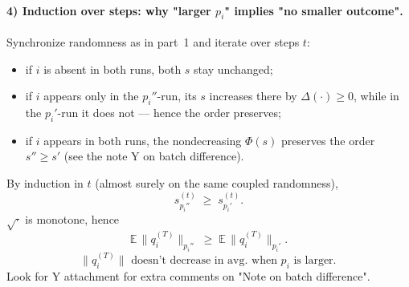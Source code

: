 \paragraph{4) Induction over steps: why "larger $p_i$" implies "no smaller outcome".}
Synchronize randomness as in part~1 and iterate over steps $t$:
\begin{itemize}
  \item if $i$ is absent in both runs, both $s$ stay unchanged;
  \item if $i$ appears only in the $p_i''$-run, its $s$ increases there by $\Delta(\cdot) \ge 0$, while in the $p_i'$-run it does not — hence the order preserves;
  \item if $i$ appears in both runs, the nondecreasing $\Phi(s)$ preserves the order $s'' \ge s'$ (see the note Y on batch difference).
\end{itemize}
By induction in $t$ (almost surely on the same coupled randomness),
\begin{equation}
s^{(t)}_{p_i''} \;\ge\; s^{(t)}_{p_i'}.
\end{equation}
$\sqrt{\cdot}$ is monotone, hence
\begin{equation}
\mathbb E\,\bigl\|q_i^{(T)}\bigr\|_{p_i''} \;\ge\; \mathbb E\,\bigl\|q_i^{(T)}\bigr\|_{p_i'}.
\end{equation}
\begin{equation}
\boxed{\bigl\|q_i^{(T)}\bigr\| \text{ doesn't decrease in avg. when } p_i \text{ is larger.} \, }
\end{equation}
Look for Y attachment for extra comments on "Note on batch difference".
